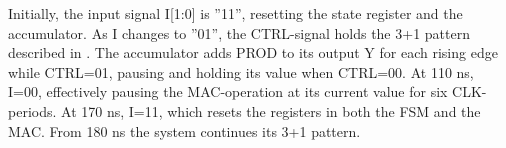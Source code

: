Initially, the input signal I[1:0] is ''11'', resetting the state register and the accumulator. As I changes to ''01'', the CTRL-signal holds the 3+1 pattern described in \cite[p.3]{project_description}. The accumulator adds PROD to its output Y for each rising edge while CTRL=01, pausing and holding its value when CTRL=00. At 110 ns, I=00, effectively pausing the MAC-operation at its current value for six CLK-periods. At 170 ns, I=11, which resets the registers in both the FSM and the MAC. From 180 ns the system continues its 3+1 pattern.

